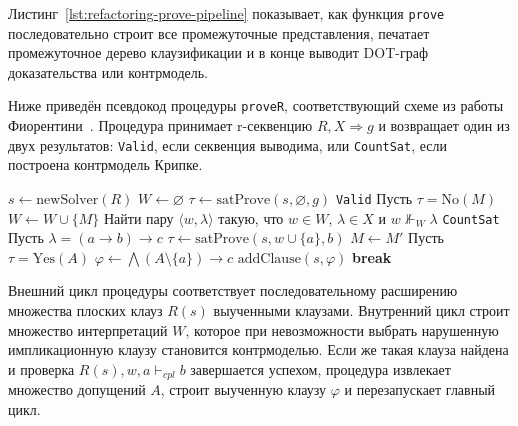 \documentclass[14pt, russian]{scrartcl}
\begin{document}
Листинг~\ref{lst:refactoring-prove-pipeline} показывает, как функция
\texttt{prove} последовательно строит все промежуточные представления, печатает
промежуточное дерево клаузификации и в конце выводит DOT-граф доказательства или
контрмодель.

\anonappendix
\label{app:prover}

Ниже приведён псевдокод процедуры \texttt{proveR}, соответствующий схеме из
работы Фиорентини~\cite{Fiorentini2021}. Процедура принимает r-секвенцию
$R, X \Rightarrow g$ и возвращает один из двух результатов: \texttt{Valid}, если
секвенция выводима, или \texttt{CountSat}, если построена контрмодель Крипке.

\begin{listing}[!htb]
\caption{Процедура \texttt{proveR} с перезапуском}
\label{alg:prover}
\begin{algorithmic}[1]
  \State $s \gets \mathrm{newSolver}(R)$
  \Loop
    \State $W \gets \varnothing$
    \State $\tau \gets \mathrm{satProve}(s, \varnothing, g)$
      \State \Return \texttt{Valid}
    \EndIf
    \State Пусть $\tau = \mathrm{No}(M)$
    \Loop
      \State $W \gets W \cup \{M\}$
      \State Найти пару $\langle w, \lambda\rangle$ такую, что
        $w \in W$, $\lambda \in X$ и $w \not\Vdash_W \lambda$
        \State \Return \texttt{CountSat}
      \EndIf
      \State Пусть $\lambda = (a \to b) \to c$
      \State $\tau \gets \mathrm{satProve}(s, w \cup \{a\}, b)$
        \State $M \gets M'$
      \Else
        \State Пусть $\tau = \mathrm{Yes}(A)$
        \State $\varphi \gets \bigwedge(A \setminus \{a\}) \to c$
        \State $\mathrm{addClause}(s, \varphi)$
        \State \textbf{break}
      \EndIf
    \EndLoop
  \EndLoop
\EndFunction
\end{algorithmic}
\end{listing}

Внешний цикл процедуры соответствует последовательному расширению множества
плоских клауз $R(s)$ выученными клауза\-ми. Внутренний цикл строит множество
интерпретаций $W$, которое при невозможности выбрать нарушенную импликационную
клаузу становится контрмоделью. Если же такая клауза найдена и проверка
$R(s), w, a \vdash_{\mathit{cpl}} b$ завершается успехом, процедура извлекает
множество допущений $A$, строит выученную клаузу $\varphi$ и перезапускает
главный цикл.

\anonappendix
\label{app:lk-lj-rules}
\end{document}
